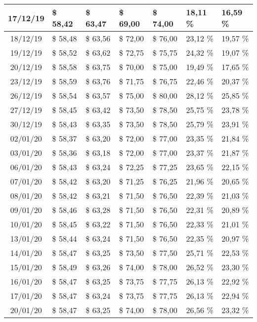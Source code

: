 \begin{center}
\begin{longtable}{|c|p{1.5cm}|p{1.5cm}|p{1.5cm}|p{1.5cm}|p{1.5cm}|p{1.5cm}|}
17/12/19 & \$ 58,42 & \$ 63,47 & \$ 69,00 & \$ 74,00 & 18,11 \% & 16,59 \% \\ \hline
18/12/19 & \$ 58,48 & \$ 63,56 & \$ 72,00 & \$ 76,00 & 23,12 \% & 19,57 \% \\ \hline
19/12/19 & \$ 58,52 & \$ 63,62 & \$ 72,75 & \$ 75,75 & 24,32 \% & 19,07 \% \\ \hline
20/12/19 & \$ 58,58 & \$ 63,75 & \$ 70,00 & \$ 75,00 & 19,49 \% & 17,65 \% \\ \hline
23/12/19 & \$ 58,59 & \$ 63,76 & \$ 71,75 & \$ 76,75 & 22,46 \% & 20,37 \% \\ \hline
26/12/19 & \$ 58,54 & \$ 63,57 & \$ 75,00 & \$ 80,00 & 28,12 \% & 25,85 \% \\ \hline
27/12/19 & \$ 58,45 & \$ 63,42 & \$ 73,50 & \$ 78,50 & 25,75 \% & 23,78 \% \\ \hline
30/12/19 & \$ 58,43 & \$ 63,35 & \$ 73,50 & \$ 78,50 & 25,79 \% & 23,91 \% \\ \hline
02/01/20 & \$ 58,37 & \$ 63,20 & \$ 72,00 & \$ 77,00 & 23,35 \% & 21,84 \% \\ \hline
03/01/20 & \$ 58,36 & \$ 63,18 & \$ 72,00 & \$ 77,00 & 23,37 \% & 21,87 \% \\ \hline
06/01/20 & \$ 58,43 & \$ 63,24 & \$ 72,25 & \$ 77,25 & 23,65 \% & 22,15 \% \\ \hline
07/01/20 & \$ 58,42 & \$ 63,20 & \$ 71,25 & \$ 76,25 & 21,96 \% & 20,65 \% \\ \hline
08/01/20 & \$ 58,42 & \$ 63,21 & \$ 71,50 & \$ 76,50 & 22,39 \% & 21,03 \% \\ \hline
09/01/20 & \$ 58,46 & \$ 63,28 & \$ 71,50 & \$ 76,50 & 22,31 \% & 20,89 \% \\ \hline
10/01/20 & \$ 58,45 & \$ 63,22 & \$ 71,50 & \$ 76,50 & 22,33 \% & 21,01 \% \\ \hline
13/01/20 & \$ 58,44 & \$ 63,24 & \$ 71,50 & \$ 76,50 & 22,35 \% & 20,97 \% \\ \hline
14/01/20 & \$ 58,47 & \$ 63,25 & \$ 73,50 & \$ 77,50 & 25,71 \% & 22,53 \% \\ \hline
15/01/20 & \$ 58,49 & \$ 63,26 & \$ 74,00 & \$ 78,00 & 26,52 \% & 23,30 \% \\ \hline
16/01/20 & \$ 58,47 & \$ 63,25 & \$ 73,75 & \$ 77,75 & 26,13 \% & 22,92 \% \\ \hline
17/01/20 & \$ 58,47 & \$ 63,24 & \$ 73,75 & \$ 77,75 & 26,13 \% & 22,94 \% \\ \hline
20/01/20 & \$ 58,47 & \$ 63,25 & \$ 74,00 & \$ 78,00 & 26,56 \% & 23,32 \% \\ \hline

\end{longtable}
\end{center}

